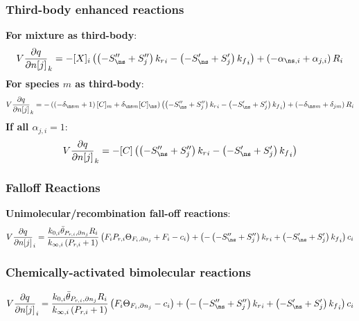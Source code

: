 \documentclass[a4paper,10pt]{article}
\begin{document}
\subsubsection{Third-body enhanced reactions}
\textbf{For mixture as third-body}:
\begin{dmath} V \frac{\partial q }{\partial n[j] }_{k} = - [X]_{i} \left(\left(- S^{\prime\prime}_{\ns} + S^{\prime\prime}_{j}\right) {k_r}_{i} - \left(- S^{\prime}_{\ns} + S^{\prime}_{j}\right) {k_f}_{i}\right) + \left(- \alpha_{\ns,i} + \alpha_{j,i}\right) R_{i}\end{dmath} 
\textbf{For species $m$ as third-body}:
\begin{dmath} V \frac{\partial q }{\partial n[j] }_{k} = - \left(\left(- \delta_{\ns m} + 1\right) [C]_{m} + \delta_{\ns m} [C]_{\ns}\right) \left(\left(- S^{\prime\prime}_{\ns} + S^{\prime\prime}_{j}\right) {k_r}_{i} - \left(- S^{\prime}_{\ns} + S^{\prime}_{j}\right) {k_f}_{i}\right) + \left(- \delta_{\ns m} + \delta_{j m}\right) R_{i}\end{dmath} 
\textbf{If all $\alpha_{j,i} = 1$}:
\begin{dmath} V \frac{\partial q }{\partial n[j] }_{k} = - [C] \left(\left(- S^{\prime\prime}_{\ns} + S^{\prime\prime}_{j}\right) {k_r}_{i} - \left(- S^{\prime}_{\ns} + S^{\prime}_{j}\right) {k_f}_{i}\right)\end{dmath} 
\subsubsection{Falloff Reactions}
\textbf{Unimolecular\slash recombination fall-off reactions}:
\begin{dmath} V \frac{\partial q }{\partial n[j] }_{i} = \frac{k_{0, i} \bar{\theta}_{P_{r, i}, \partial n_j} R_{i}}{k_{\infty, i} \left(P_{r, i} + 1\right)} \left(F_{i} P_{r, i} \Theta_{F_i, \partial n_j} + F_{i} - c_{i}\right) + \left(- \left(- S^{\prime\prime}_{\ns} + S^{\prime\prime}_{j}\right) {k_r}_{i} + \left(- S^{\prime}_{\ns} + S^{\prime}_{j}\right) {k_f}_{i}\right) c_{i}\end{dmath} 
\subsubsection{Chemically-activated bimolecular reactions}
\begin{dmath} V \frac{\partial q }{\partial n[j] }_{i} = \frac{k_{0, i} \bar{\theta}_{P_{r, i}, \partial n_j} R_{i}}{k_{\infty, i} \left(P_{r, i} + 1\right)} \left(F_{i} \Theta_{F_i, \partial n_j} - c_{i}\right) + \left(- \left(- S^{\prime\prime}_{\ns} + S^{\prime\prime}_{j}\right) {k_r}_{i} + \left(- S^{\prime}_{\ns} + S^{\prime}_{j}\right) {k_f}_{i}\right) c_{i}\end{dmath} 
\end{document}
